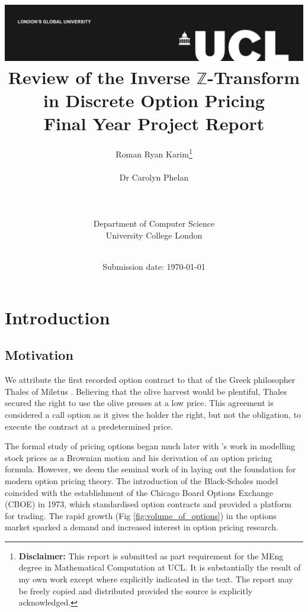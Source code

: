 \documentclass[a4paper]{report}
\title{{\vspace{-14em} \includegraphics[scale=0.4]{Logos/ucl_logo.png}}\\
{{\vspace{2em} \Huge Review of the Inverse $\mathbb{Z}$-Transform in Discrete Option Pricing}}\\
{\large Final Year Project Report}\\
}
\date{Submission date: \today}
\author{Roman Ryan Karim\thanks{
{\bf Disclaimer:}
This report is submitted as part requirement for the MEng degree in Mathematical Computation at UCL. It is substantially the result of my own work except where explicitly indicated in the text. The report may be freely copied and distributed provided the source is explicitly acknowledged.}
\\ \\ Dr Carolyn Phelan
\\ \\ \\ \\ Department of Computer Science
\\ University College London
\\ \\
}
\begin{document}
 
\onehalfspacing
\maketitle
\begin{abstract}

\end{abstract}

\tableofcontents
\setcounter{page}{1}

\chapter{Introduction}
\section{Motivation}
We attribute the first recorded option contract to that of the Greek philosopher Thales of Miletus \citep{thompson1994aristotle}. Believing that the olive harvest would be plentiful, Thales secured the right to use the olive presses at a low price. This agreement is considered a call option as it gives the holder the right, but not the obligation, to execute the contract at a predetermined price.

The formal study of pricing options began much later with \citet{bachelier1900theorie}'s work in modelling stock prices as a Brownian motion and his derivation of an option pricing formula. However, we deem the seminal work of \citet{black1973pricing} in laying out the foundation for modern option pricing theory. The introduction of the Black-Scholes model coincided with the establishment of the Chicago Board Options Exchange (CBOE) in 1973, which standardised option contracts and provided a platform for trading. The rapid growth (Fig \ref{fig:volume_of_options}) in the options market sparked a demand and increased interest in option pricing research.
\end{document}
